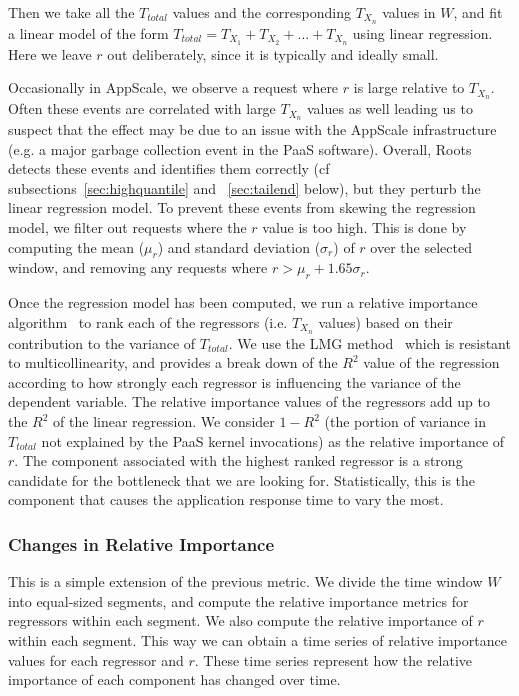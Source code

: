 Then we take all the $T_{total}$ values
and the corresponding $T_{X_n}$ values in $W$, and fit 
a linear model of the form 
$T_{total} = T_{X_1} + T_{X_2} + ... + T_{X_n}$
using linear regression. Here we leave $r$ out
deliberately, since it is typically and ideally small. 

Occasionally in AppScale, we observe a request where $r$ is
large relative to $T_{X_n}$.  Often these events are correlated with large
$T_{X_n}$ values as well leading us to suspect that the effect may be due to
an issue with the AppScale infrastructure (e.g. a major garbage collection
event in the PaaS software).  Overall, Roots detects these events and identifies them correctly (cf
subsections~\ref{sec:highquantile} and ~\ref{sec:tailend} below), but they
perturb the linear regression model.  To prevent these events
from skewing the regression model, we filter out requests where the $r$ value is too high. This
is done by computing the mean ($\mu_r$) and standard deviation ($\sigma_r$) of $r$ 
over the selected window, and removing 
any requests where $r > \mu_r + 1.65\sigma_r$.

Once the regression model has been computed, we run a relative importance algorithm~\cite{JSSv017i01} to rank each of the
regressors (i.e. $T_{X_n}$ values) based on their contribution to the variance of $T_{total}$. 
We use the LMG method~\cite{lmg80} which is resistant to multicollinearity, and provides a break down of the $R^2$ value of
the regression according to how strongly each regressor is influencing the variance of the dependent variable.
The relative importance values of the regressors add up to the $R^2$ of the linear regression. We consider
$1 - R^2$ (the portion of variance in $T_{total}$ not explained by the PaaS kernel invocations) as the relative importance of $r$. 
The component associated with the highest ranked regressor is a strong candidate
for the bottleneck that we are looking for. Statistically, this is the component that causes the application
response time to vary the most.

\subsubsection{Changes in Relative Importance}
This is a simple extension of the previous metric. We divide the time window $W$ into equal-sized segments,
and compute the relative importance metrics for regressors within each segment. We also compute the
relative importance of $r$ within each segment. This way we can
obtain a time series of relative importance values for each regressor and $r$. These time series
represent how the relative importance of each component has changed over time.

